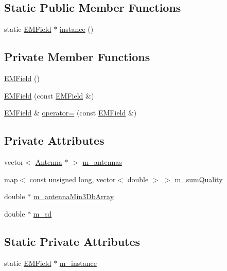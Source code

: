 \subsection*{Static Public Member Functions}
\begin{DoxyCompactItemize}
\item 
static \mbox{\hyperlink{class_e_m_field}{E\+M\+Field}} $\ast$ \mbox{\hyperlink{class_e_m_field_acbadbede116ac320398cbfcd19e90ec7}{instance}} ()
\end{DoxyCompactItemize}
\subsection*{Private Member Functions}
\begin{DoxyCompactItemize}
\item 
\mbox{\hyperlink{class_e_m_field_a054f389cfa853008f32c02d874aa4d58}{E\+M\+Field}} ()
\item 
\mbox{\hyperlink{class_e_m_field_a7760631ded36ba2c5a918c97a1cc93e9}{E\+M\+Field}} (const \mbox{\hyperlink{class_e_m_field}{E\+M\+Field}} \&)
\item 
\mbox{\hyperlink{class_e_m_field}{E\+M\+Field}} \& \mbox{\hyperlink{class_e_m_field_ad35e4754cad2016d7df1b8ac45540b35}{operator=}} (const \mbox{\hyperlink{class_e_m_field}{E\+M\+Field}} \&)
\end{DoxyCompactItemize}
\subsection*{Private Attributes}
\begin{DoxyCompactItemize}
\item 
vector$<$ \mbox{\hyperlink{class_antenna}{Antenna}} $\ast$ $>$ \mbox{\hyperlink{class_e_m_field_ab74a3bde70b66fd033bde6c25345a755}{m\+\_\+antennas}}
\item 
map$<$ const unsigned long, vector$<$ double $>$ $>$ \mbox{\hyperlink{class_e_m_field_a18e5a4d972d888c5da458e30e426c7ae}{m\+\_\+sum\+Quality}}
\item 
double $\ast$ \mbox{\hyperlink{class_e_m_field_a96c4c7bc39c2f8afea0dca3280fe145c}{m\+\_\+antenna\+Min3\+Db\+Array}}
\item 
double $\ast$ \mbox{\hyperlink{class_e_m_field_ac2142eafd5b82e43437a8047565f619c}{m\+\_\+sd}}
\end{DoxyCompactItemize}
\subsection*{Static Private Attributes}
\begin{DoxyCompactItemize}
\item 
static \mbox{\hyperlink{class_e_m_field}{E\+M\+Field}} $\ast$ \mbox{\hyperlink{class_e_m_field_a3a75e412fa15cfab78ce64dfbb8af52d}{m\+\_\+instance}}
\end{DoxyCompactItemize}


